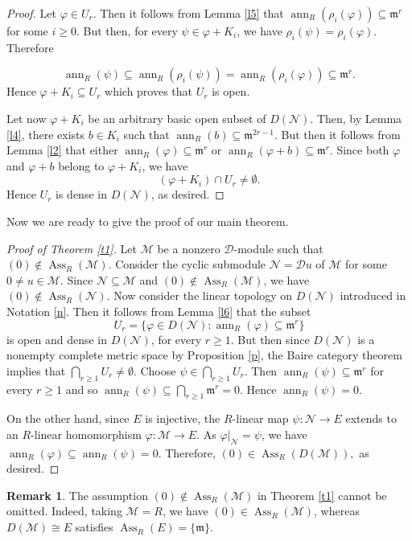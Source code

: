 \documentclass[11pt]{amsart}
\theoremstyle{definition}
\newtheorem{remark}[theorem]{Remark}
\newcommand{\m}{\mathfrak m}
\newcommand{\D}{\mathcal D}
\newcommand{\M}{\mathcal M}
\newcommand{\N}{\mathcal N}
\DeclareMathOperator{\ann}{ann}
\DeclareMathOperator{\Ass}{Ass}
\begin{document}
\begin{proof}
Let $\varphi\in U_r$. Then it follows from  Lemma \ref{l5} that $\ann_R(\rho_i(\varphi))
\subseteq\m^r$ for some $i\geq 0$. But then, for every $\psi\in\varphi+K_i$, we have $\rho_i(\psi)=\rho_i(\varphi).$ Therefore 
 
\[
\ann_R(\psi)\subseteq \ann_R(\rho_i(\psi))=\ann_R(\rho_i(\varphi))\subseteq\m^r.
\]
Hence $\varphi+K_i\subseteq U_r$ which proves that $U_r$ is open.

Let now $\varphi+K_i$ be an arbitrary basic open subset of $D(\N)$. Then, by Lemma \ref{l4}, there exists $b\in K_i$ such that $\ann_R(b)
\subseteq\m^{2r-1}.$ But then it follows from Lemma \ref{l2} that either $\ann_R(\varphi)
\subseteq\m^r$ or $\ann_R(\varphi+b)\subseteq\m^r.$ Since both $\varphi$ and $\varphi+b$
belong to $\varphi+K_i$, we have
\[
(\varphi+K_i)\cap U_r\neq\emptyset.
\]
Hence $U_r$ is dense in $D(\N)$, as desired.
\end{proof}
Now we are ready to give the proof of our main theorem.
\begin{proof}[Proof of Theorem \ref{t1}] Let $\M$ be a nonzero $\D$-module such that $(0)\notin \Ass_R(\M)$. Consider the cyclic submodule $\N=\D u$ of $\M$ for some $0\neq u\in\M$. 
Since $\N\subseteq \M$ and $(0)\notin \Ass_R(\M)$, we have $(0)\notin\Ass_R(\N)$.
Now consider the linear topology on $D(\N)$ introduced in Notation \ref{n}. Then it follows from Lemma \ref{l6} that the subset
\[
U_r=\{\varphi\in D(\N):
\ann_R(\varphi)\subseteq\m^r\}
\]
is open and dense in $D(\N)$, for every $r\geq 1$. But then since $D(\N)$ is a nonempty complete metric space by Proposition \ref{p}, the Baire category theorem implies that $\bigcap_{r\geq 1}U_r\neq\emptyset.$
Choose $\psi\in \bigcap_{r\geq 1}U_r$.  Then $\ann_R(\psi)\subseteq\m^r$ for every $r\geq 1$ and so $\ann_R(\psi)\subseteq\bigcap_{r\geq 1}\m^r=0$. Hence $\ann_R(\psi)=0$.

On the other hand, since $E$ is injective, the $R$-linear map $\psi:\N\to E$ extends to an $R$-linear homomorphism $\varphi:\M\to E$. As $\varphi|_\N=\psi$, we have $\ann_R(\varphi)
\subseteq\ann_R(\psi)=0.$ Therefore, $(0)\in\Ass_R( D(\M)),$ as desired.
\end{proof}


\begin{remark}
The assumption $(0)\notin\operatorname{Ass}_R(\M)$ in Theorem \ref{t1} cannot be omitted. Indeed, taking $\M=R$, we have $(0)\in\operatorname{Ass}_R(\M)$, whereas $D(\M)\cong E$ satisfies $\operatorname{Ass}_R(E)=\{\mathfrak m\}$.
\end{remark}
\end{document}
